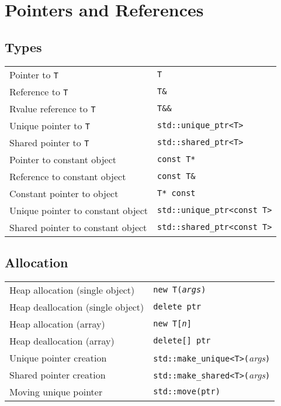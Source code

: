 \section{Pointers and References}

\subsection{Types}
\begin{center}
  \begin{tabular}{ll}
    Pointer to \verb'T' & \verb'T' \\
    Reference to \verb'T' & \verb'T&' \\
    Rvalue reference to \verb'T' & \verb'T&&' \\
    Unique pointer to \verb'T' & \verb'std::unique_ptr<T>' \\
    Shared pointer to \verb'T' & \verb'std::shared_ptr<T>' \\
    Pointer to constant object & \verb'const T*' \\
    Reference to constant object & \verb'const T&' \\
    Constant pointer to object & \verb'T* const' \\
    Unique pointer to constant object & \verb'std::unique_ptr<const T>' \\
    Shared pointer to constant object & \verb'std::shared_ptr<const T>' \\
  \end{tabular}
\end{center}

\subsection{Allocation}
\begin{center}
  \begin{tabular}{ll}
    Heap allocation (single object) & \tt new T({\it args}) \\
    Heap deallocation (single object) & \tt delete ptr \\
    Heap allocation (array) & \tt new T[{\it n}] \\
    Heap deallocation (array) & \tt delete[] ptr \\
    Unique pointer creation & \verb'std::make_unique<T>('{\it args}\verb')' \\
    Shared pointer creation & \verb'std::make_shared<T>('{\it args}\verb')' \\
    Moving unique pointer & \verb'std::move(ptr)' \\
  \end{tabular}
\end{center}


